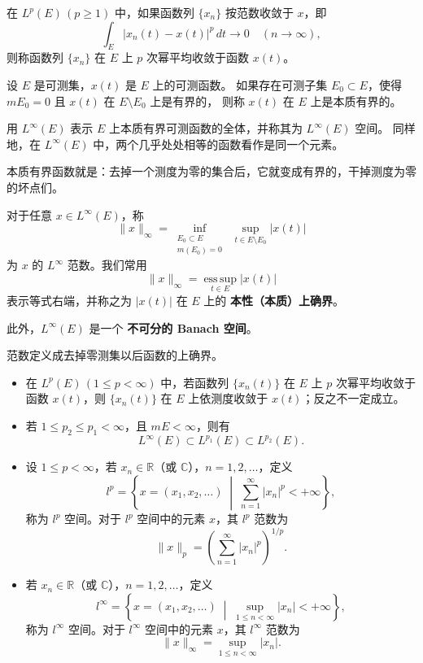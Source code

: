 \begin{definition}[点列收敛]
在 $L^p(E)\,(p\ge1)$ 中，如果函数列 $\{x_n\}$ 按范数收敛于 $x$，即
\[
\int_E |x_n(t)-x(t)|^p\,dt \to 0 \quad (n\to\infty),
\]
则称函数列 $\{x_n\}$ 在 $E$ 上 $p$ 次幂平均收敛于函数 $x(t)$。
\end{definition}
\begin{definition}
设 $E$ 是可测集，$x(t)$ 是 $E$ 上的可测函数。  
如果存在可测子集 $E_0 \subset E$，使得 $mE_0 = 0$ 且 $x(t)$ 在 $E \setminus E_0$ 上是有界的，  
则称 $x(t)$ 在 $E$ 上是本质有界的。  

用 $L^{\infty}(E)$ 表示 $E$ 上本质有界可测函数的全体，并称其为 $L^{\infty}(E)$ 空间。  
同样地，在 $L^{\infty}(E)$ 中，两个几乎处处相等的函数看作是同一个元素。
\end{definition}
本质有界函数就是：去掉一个测度为零的集合后，它就变成有界的，干掉测度为零的坏点们。
\begin{definition}
对于任意 $x \in L^{\infty}(E)$，称
\[
\|x\|_{\infty}
= \inf_{\substack{E_0 \subset E \\ m(E_0)=0}}
\;\sup_{t \in E \setminus E_0} |x(t)|
\]
为 $x$ 的 $L^{\infty}$ 范数。我们常用
\[
\|x\|_{\infty} = \operatorname*{ess\,sup}_{t\in E} |x(t)|
\]
表示等式右端，并称之为 $|x(t)|$ 在 $E$ 上的 \textbf{本性（本质）上确界}。

此外，$L^{\infty}(E)$ 是一个 \textbf{不可分的 Banach 空间}。
\end{definition}
范数定义成去掉零测集以后函数的上确界。
\begin{remark}
\begin{itemize}
  \item 在 $L^p(E)\,(1 \le p < \infty)$ 中，若函数列 $\{x_n(t)\}$ 在 $E$ 上 $p$ 次幂平均收敛于函数 $x(t)$，则 $\{x_n(t)\}$ 在 $E$ 上依测度收敛于 $x(t)$；反之不一定成立。
  \item 若 $1 \le p_2 \le p_1 < \infty$，且 $mE < \infty$，则有
  \[
  L^{\infty}(E) \subset L^{p_1}(E) \subset L^{p_2}(E).
  \]
\end{itemize}
\end{remark}
\begin{proposition}[两种范数对比]
\begin{itemize}
  \item 设 $1 \le p < \infty$，若 $x_n \in \mathbb{R}$（或 $\mathbb{C}$），$n=1,2,\ldots$，定义
  \[
  l^p = \left\{ x = (x_1,x_2,\ldots)\;\middle|\;\sum_{n=1}^{\infty}|x_n|^p < +\infty \right\},
  \]
  称为 $l^p$ 空间。对于 $l^p$ 空间中的元素 $x$，其 $l^p$ 范数为
  \[
  \|x\|_p = \left(\sum_{n=1}^{\infty}|x_n|^p\right)^{1/p}.
  \]

  \item 若 $x_n \in \mathbb{R}$（或 $\mathbb{C}$），$n=1,2,\ldots$，定义
  \[
  l^{\infty} = \left\{ x = (x_1,x_2,\ldots)\;\middle|\;\sup_{1\le n<\infty}|x_n| < +\infty \right\},
  \]
  称为 $l^{\infty}$ 空间。对于 $l^{\infty}$ 空间中的元素 $x$，其 $l^{\infty}$ 范数为
  \[
  \|x\|_{\infty} = \sup_{1\le n<\infty}|x_n|.
  \]
\end{itemize}
\end{proposition}

